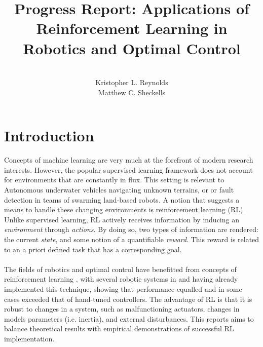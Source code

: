 \documentclass[10pt]{article}
\begin{document}
\title{Progress Report: Applications of Reinforcement Learning in Robotics and Optimal Control}%
\author{\\ %
Kristopher L. Reynolds\\
Matthew C. Sheckells
\\} %
\maketitle
\section{Introduction}
Concepts of machine learning are very much at the forefront of modern research interests. However, the popular supervised learning framework does not account for environments that are constantly in flux. This setting is relevant to Autonomous underwater vehicles navigating unknown terrains, or or fault detection in teams of swarming land-based robots. A notion that suggests a means to handle these changing environments is reinforcement learning (RL). Unlike supervised learning, RL actively receives information by inducing an \textit{environment} through \textit{actions}. By doing so, two types of information are rendered: the current \textit{state}, and some notion of a quantifiable \textit{reward}. This reward is related to an a priori defined task that has a corresponding goal. 
\\
\\
The fields of robotics and optimal control have benefitted from concepts of reinforcement learning\cite{kober_reinforcement_2013} \cite{kaelbling_reinforcement_1996}, with several robotic systems in  \cite{bhasin_reinforcement_2011} and \cite{hester_rtmba:_2012} having already implemented this technique, showing that performance equalled and in some cases exceeded that of hand-tuned controllers. The advantage of RL is that it is robust to changes in a system, such as malfunctioning actuators, changes in models parameters (i.e. inertia), and external disturbances. This reports aims to balance theoretical results with empirical demonstrations of successful RL implementation. 
\end{document}
